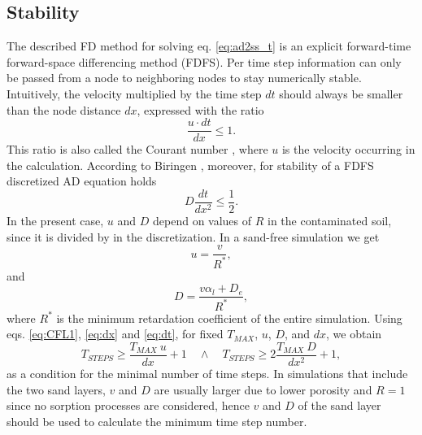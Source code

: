 \subsection{Stability}
The described FD method for solving eq. \ref{eq:ad2ss_t} is an explicit forward-time forward-space differencing method (FDFS). Per time step information can only be passed from a node to neighboring nodes to stay numerically stable. Intuitively, the velocity multiplied by the time step $dt$ should always be smaller than the node distance $dx$, expressed with the ratio
\begin{equation}
    \frac{u\cdot dt}{dx} \leq 1.
    \label{eq:CFL1}
\end{equation}
This ratio is also called the Courant number \cite{Courant1928Dec}, where $u$ is the velocity occurring in the calculation. According to Biringen \cite{Biringen1981Mar}, moreover, for stability of a FDFS discretized AD equation holds
\begin{equation}
    D\frac{dt}{dx^2} \leq \frac{1}{2}.
    \label{eq:CFL2}
\end{equation}
In the present case, $u$ and $D$ depend on values of $R$ in the contaminated soil, since it is divided by in the discretization. In a sand-free simulation we get
\begin{equation}
    u = \frac{v}{R^*},
\end{equation}
and
\begin{equation}
    D = \frac{v\alpha_l + D_e}{R^*},
\end{equation}
where $R^*$ is the minimum retardation coefficient of the entire simulation. Using eqs. \ref{eq:CFL1}, \ref{eq:dx} and \ref{eq:dt}, for fixed $T_{MAX}$, $u$, $D$, and $dx$, we obtain
\begin{equation}
    T_{STEPS} \geq \frac{T_{MAX}\:u}{dx} + 1 \quad \land \quad T_{STEPS} \geq 2\frac{T_{MAX}\:D}{dx^2} + 1,
    \label{eq:CFL}
\end{equation}
as a condition for the minimal number of time steps.
In simulations that include the two sand layers, $v$ and $D$ are usually larger due to lower porosity and $R=1$ since no sorption processes are considered, hence $v$ and $D$ of the sand layer should be used to calculate the minimum time step number.
